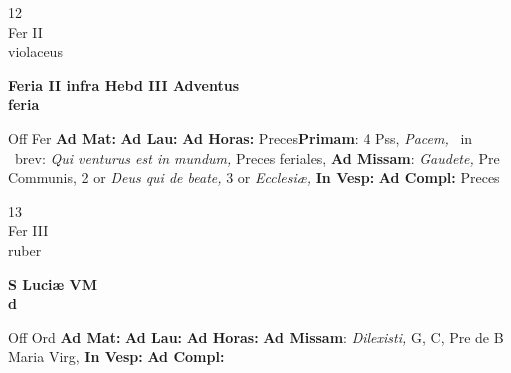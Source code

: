 \documentclass[10pt, openany]{book}
\begin{document}
        \begin{center}
            \begin{minipage}{3.5in}
                \vspace{2em}
                \begin{minipage}{0.5in}
                    {\Huge 12} \\
                    {\normalsize Fer II} \\
                    {\normalsize violaceus}
                \end{minipage}
                \begin{minipage}{3.0in}
                    \textbf{ \large Feria II infra Hebd III Adventus \\
                    \textnormal{\normalsize feria}} \\ 
                \end{minipage}
                \begin{justify}Off Fer
                    \textbf{Ad Mat: }
                    \textbf{Ad Lau: }
                    \textbf{Ad Horas: }Preces\textbf{Primam}: 4 Pss, \textit{Pacem,} \Vbar\ in \Rbar\ brev: \textit{Qui venturus est in mundum,} Preces feriales, \textbf{Ad Missam}: \textit{Gaudete,} Pre Communis, 2 or \textit{Deus qui de beate,} 3 or \textit{Ecclesiæ,}  
                    \textbf{In Vesp: }
                    \textbf{Ad Compl: }Preces
                \end{justify}
            \end{minipage}
        \end{center}
    
        \begin{center}
            \begin{minipage}{3.5in}
                \vspace{2em}
                \begin{minipage}{0.5in}
                    {\Huge 13} \\
                    {\normalsize Fer III} \\
                    {\normalsize ruber}
                \end{minipage}
                \begin{minipage}{3.0in}
                    \textbf{ \large S Luciæ VM \\
                    \textnormal{\normalsize d}} \\ 
                \end{minipage}
                \begin{justify}Off Ord
                    \textbf{Ad Mat: }
                    \textbf{Ad Lau: }
                    \textbf{Ad Horas: }\textbf{Ad Missam}: \textit{Dilexisti,} G, C, Pre de B Maria Virg,  
                    \textbf{In Vesp: }
                    \textbf{Ad Compl: }
                \end{justify}
            \end{minipage}
        \end{center}
    
\end{document}
